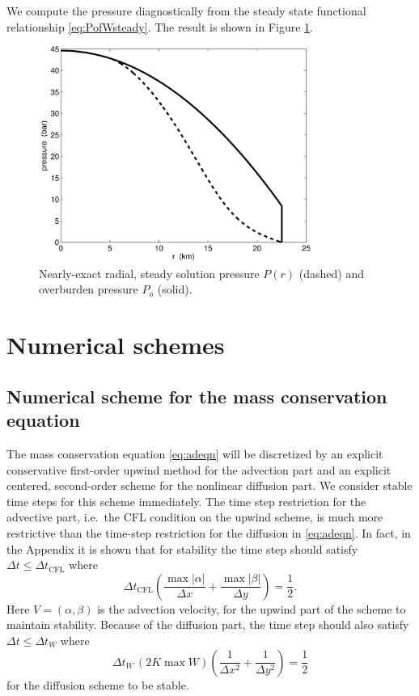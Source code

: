 \documentclass[11pt,final]{amsart}%
\begin{document}
We compute the pressure diagnostically from the steady state functional relationship \eqref{eq:PofWsteady}.  The result is shown in Figure \ref{fig:Pexact}.

\begin{figure}[ht]
\includegraphics[width=3.5in,keepaspectratio=true]{figs/exact-P-plot}
\caption{Nearly-exact radial, steady solution pressure $P(r)$ (dashed) and overburden pressure $P_o$ (solid).}
\label{fig:Pexact}
\end{figure}


\section{Numerical schemes}  \label{sec:num}

\subsection*{Numerical scheme for the mass conservation equation}  The mass conservation equation \eqref{eq:adeqn} will be discretized by an explicit conservative first-order upwind method for the advection part and an explicit centered, second-order scheme for the nonlinear diffusion part.  We consider stable time steps for this scheme immediately.  The time step restriction for the advective part, i.e.~the CFL condition on the upwind scheme, is much more restrictive than the time-step restriction for the diffusion in \eqref{eq:adeqn}.  In fact, in the Appendix it is shown that for stability the time step should satisfy $\Delta t \le \Delta t_{\text{CFL}}$ where
\begin{equation}
\Delta t_{\text{CFL}} \left(\frac{\max |\alpha|}{\Delta x} + \frac{\max |\beta|}{\Delta y}\right) = \frac{1}{2}. \label{eq:dtCFL}
\end{equation}
Here $V=(\alpha,\beta)$ is the advection velocity, for the upwind part of the scheme to maintain stability.  Because of the diffusion part, the time step should also satisfy $\Delta t \le \Delta t_{W}$ where
\begin{equation}
\Delta t_W\, (2 K \max W) \left(\frac{1}{\Delta x^2} + \frac{1}{\Delta y^2}\right) = \frac{1}{2} \label{eq:dtDIFFW}
\end{equation}
for the diffusion scheme to be stable.
\end{document}

